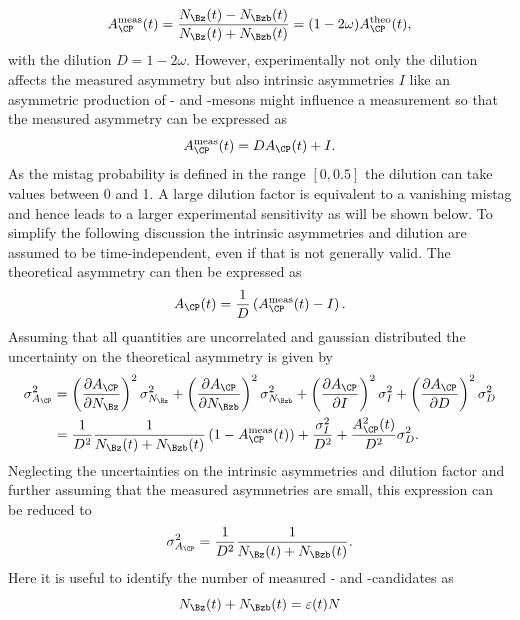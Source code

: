 \begin{equation}
A_{\CP}^{\text{meas}}(t)=\frac{N_{\Bz}(t)-N_{\Bzb}(t)}{N_{\Bz}(t)+N_{\Bzb}(t)}=(1-2\omega)A_{\CP}^{\text{theo}}(t),
\end{equation}
with the dilution $D=1-2\omega$.
However, experimentally not only the dilution affects the measured asymmetry but also intrinsic asymmetries $I$ like an asymmetric production of \Bz- and \Bzb-mesons might influence a measurement so that the measured asymmetry can be expressed as
\begin{equation}
A_{\CP}^{\text{meas}}(t)=DA_{\CP}(t)+I.
\end{equation}
As the mistag probability is defined in the range $[0, 0.5]$ the dilution can take values between \num{0} and \num{1}.
A large dilution factor is equivalent to a vanishing mistag and hence leads to a larger experimental sensitivity as will be shown below.
To simplify the following discussion the intrinsic asymmetries and dilution are assumed to be time-independent, even if that is not generally valid.
The theoretical asymmetry can then be expressed as
\begin{equation}
A_{\CP}(t)=\frac{1}{D}\left(A_{\CP}^{\text{meas}}(t)-I\right).
\end{equation}
Assuming that all quantities are uncorrelated and gaussian distributed the uncertainty on the theoretical asymmetry is given by
\begin{equation}
\begin{aligned}
\sigma_{A_{\CP}}^2&=\left(\frac{\partial A_{\CP}}{\partial N_{\Bz}}\right)^2\sigma_{N_{\Bz}}^2+\left(\frac{\partial A_{\CP}}{\partial N_{\Bzb}}\right)^2\sigma_{N_{\Bzb}}^2+\left(\frac{\partial A_{\CP}}{\partial I}\right)^2\sigma_{I}^2+\left(\frac{\partial A_{\CP}}{\partial D}\right)^2\sigma_{D}^2\\
&=\frac{1}{D^2}\frac{1}{N_{\Bz}(t)+N_{\Bzb}(t)}\left(1-A_{\CP}^{\text{meas}}(t)\right)+\frac{\sigma_{I}^2}{D^2}+\frac{A_{\CP}^2(t)}{D^2}\sigma_{D}^2.
\end{aligned}
\end{equation}
Neglecting the uncertainties on the intrinsic asymmetries and dilution factor and further assuming that the measured asymmetries are small, this expression can be reduced to
\begin{equation}
\sigma_{A_{\CP}}^2=\frac{1}{D^2}\frac{1}{N_{\Bz}(t)+N_{\Bzb}(t)}.
\end{equation}
Here it is useful to identify the number of measured \Bz- and \Bzb-candidates as
\begin{equation}
N_{\Bz}(t)+N_{\Bzb}(t)=\varepsilon(t)N
\end{equation}
